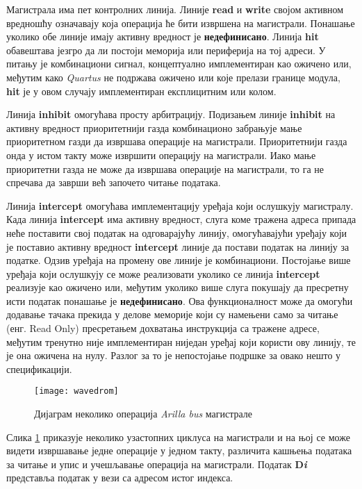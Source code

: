Магистрала има пет контролних линија. Линије \textbf{read} и \textbf{write} својом активном вредношћу означавају која операција ће бити извршена на магистрали. Понашање уколико обе линије имају активну вредност је \textbf{недефинисано}. Линија \textbf{hit} обавештава језгро да ли постоји меморија или периферија на тој адреси. У питању је комбинациони сигнал, концептуално имплементиран као ожичено или, међутим како \textit{Quartus} не подржава ожичено или које прелази границе модула, \textbf{hit} је у овом случају имплементиран експлицитним или колом.

Линија \textbf{inhibit} омогућава просту арбитрацију. Подизањем линије \textbf{inhibit} на активну вредност приоритетнији газда комбинационо забрањује мање приоритетном газди да извршава операције на магистрали. Приоритетнији газда онда у истом такту може извршити операцију на магистрали. Иако мање приоритетни газда не може да извршава операције на магистрали, то га не спречава да заврши већ започето читање података.

Линија \textbf{intercept} омогућава имплементацију уређаја који ослушкују магистралу. Када линија \textbf{intercept} има активну вредност, слуга коме тражена адреса припада неће поставити свој податак на одговарајућу линију, омогућавајући уређају који је поставио активну вредност \textbf{intercept} линије да постави податак на линију за податке. Одзив уређаја на промену ове линије је комбинациони. Постојање више уређаја који ослушкују се може реализовати уколико се линија \textbf{intercept} реализује као ожичено или, међутим уколико више слуга покушају да пресретну исти податак понашање је \textbf{недефинисано}. Ова функционалност може да омогући додавање тачака прекида у делове меморије који су намењени само за читање (енг. Read Only) пресретањем дохватања инструкција са тражене адресе, међутим тренутно није имплементиран ниједан уређај који користи ову линију, те је она ожичена на нулу. Разлог за то је непостојање подршке за овако нешто у спецификацији\cite{debug_spec}.

\begin{figure}[h!]
	\centering
	\texttt{[image: wavedrom]}
	\caption{Дијаграм неколико операција \textit{Arilla bus} магистрале}
	\label{fig:busop}
\end{figure}

Слика \ref{fig:busop} приказује неколико узастопних циклуса на магистрали и на њој се може видети извршавање једне операције у једном такту, различита кашњења података за читање и упис и учешљавање операција на магистрали. Податак \textbf{D\textit{i}} представља податак у вези са адресом истог индекса.

